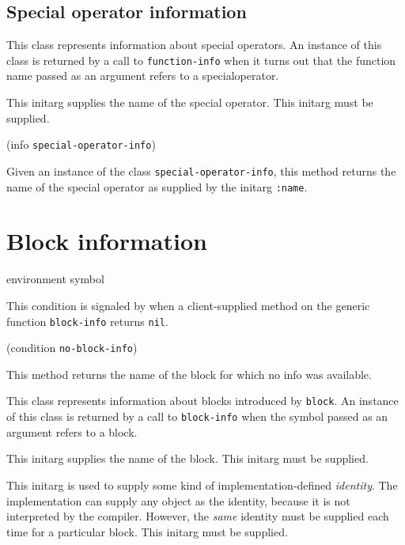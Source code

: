 \subsection{Special operator information}


This class represents information about special operators.  An
instance of this class is returned by a call to \texttt{function-info}
when it turns out that the function name passed as an argument refers
to a specialoperator.


This initarg supplies the name of the special operator.  This initarg
must be supplied.

 {(info {\tt special-operator-info})}

Given an instance of the class \texttt{special-operator-info}, this
method returns the name of the special operator as supplied by the
initarg \texttt{:name}.

\section{Block information}

 {environment symbol}


This condition is signaled by \sysname{} when a client-supplied method
on the generic function \texttt{block-info} returns \texttt{nil}.

 {(condition {\tt no-block-info})}

This method returns the name of the block for which no info was
available. 


This class represents information about blocks introduced by
\texttt{block}.  An instance of this class is returned by a call to
\texttt{block-info} when the symbol passed as an argument refers to a
block.


This initarg supplies the name of the block.  This initarg must be
supplied.


This initarg is used to supply some kind of implementation-defined 
\emph{identity}.  The implementation can supply any object as the
identity, because it is not interpreted by the compiler.  However, the
\emph{same} identity must be supplied each time for a particular
block.  This initarg must be supplied. 

